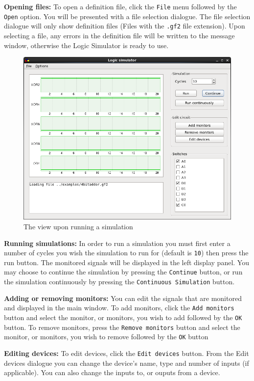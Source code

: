 \documentclass[a4paper,10pt]{article}
\begin{document}
\textbf{Opening files:} To open a definition file, click the \texttt{File} menu followed by the \texttt{Open} option. You will be presented with a file selection dialogue. The file selection dialogue will only show definition files (Files with the \texttt{.gf2} file extension). Upon selecting a file, any errors in the definition file will be written to the message window, otherwise the Logic Simulator is ready to use. 

\begin{figure}[h]
        \centering
        \includegraphics[width=.8\textwidth]{../../report2/jam96/simulation}
        \caption{The view upon running a simulation}
        \label{fig:simulation}
\end{figure}

\textbf{Running simulations:} In order to run a simulation you must first enter a number of cycles you wish the simulation to run for (default is \texttt{10}) then press the run button. The monitored signals will be displayed in the left display panel. You may choose to continue the simulation by pressing the \texttt{Continue} button, or run the simulation continuously by pressing the \texttt{Continuous Simulation} button.

\textbf{Adding or removing monitors:} You can edit the signals that are monitored and displayed in the main window. To add monitors, click the \texttt{Add monitors} button and select the monitor, or monitors, you wish to add followed by the \texttt{OK} button. To remove monitors, press the \texttt{Remove monitors} button and select the monitor, or monitors, you wish to remove followed by the \texttt{OK} button

\textbf{Editing devices:} To edit devices, click the \texttt{Edit devices} button. From the Edit devices dialogue you can change the device's name, type and number of inputs (if applicable). You can also change the inputs to, or ouputs from a device.
\end{document}
